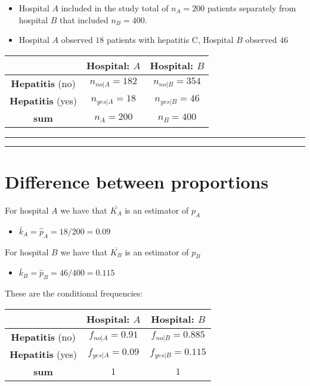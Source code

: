 \documentclass[
]{book}
\providecommand{\tightlist}{%
  \setlength{\itemsep}{0pt}\setlength{\parskip}{0pt}}
\begin{document}
\begin{itemize}
\item
  Hospital \(A\) included in the study total of \(n_A=200\) patients separately from hospital \(B\) that included \(n_B=400\).
\item
  Hospital \(A\) observed \(18\) patients with hepatitis C, Hospital \(B\) observed \(46\)
\end{itemize}

\begin{longtable}[]{@{}ccc@{}}
\toprule
& Hospital: \(A\) & Hospital: \(B\) \\
\midrule
\endhead
\textbf{Hepatitis} (no) & \(n_{no|A}=182\) & \(n_{no|B}=354\) \\
\textbf{Hepatitis} (yes) & \(n_{yes|A}=18\) & \(n_{yes|B}=46\) \\
\textbf{sum} & \(n_A=200\) & \(n_B=400\) \\
\bottomrule
\end{longtable}

\begin{center}\rule{0.5\linewidth}{0.5pt}\end{center}

\begin{center}\rule{0.5\linewidth}{0.5pt}\end{center}

\hypertarget{difference-between-proportions-3}{%
\section{Difference between proportions}\label{difference-between-proportions-3}}

For hospital \(A\) we have that \(\bar{K_A}\) is an estimator of \(p_A\)

\begin{itemize}
\tightlist
\item
  \(\bar{k}_A=\hat{p}_A=18/200=0.09\)
\end{itemize}

For hospital \(B\) we have that \(\bar{K_B}\) is an estimator of \(p_B\)

\begin{itemize}
\tightlist
\item
  \(\bar{k}_B=\hat{p}_B=46/400=0.115\)
\end{itemize}

These are the conditional frequencies:

\begin{longtable}[]{@{}ccc@{}}
\toprule
& Hospital: \(A\) & Hospital: \(B\) \\
\midrule
\endhead
\textbf{Hepatitis} (no) & \(f_{no|A}=0.91\) & \(f_{no|B}=0.885\) \\
\textbf{Hepatitis} (yes) & \(f_{yes|A}=0.09\) & \(f_{yes|B}=0.115\) \\
\textbf{sum} & \(1\) & \(1\) \\
\bottomrule
\end{longtable}
\end{document}
